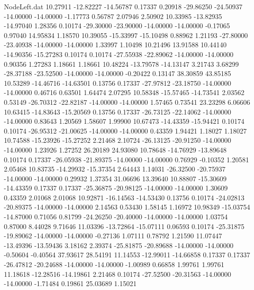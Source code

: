 \begin{filecontents}{NodeLeft.dat}
  10.27911  -12.82227  -14.56787     0.17337    0.20918  -29.86250  -24.50937  -14.00000  -14.00000   -1.17773    0.56787    2.07946    2.50902
  10.33985  -13.82935  -14.97040     1.28356    0.10174  -29.30000  -23.90000  -14.00000  -14.00000   -0.17065    0.97040   14.95834    1.18570
  10.39055  -15.33997  -15.10498     0.88962    1.21193  -27.80000  -23.40938  -14.00000  -14.00000    1.33997    1.10498   10.21496   13.91588
  10.44140  -14.90356  -15.27283     0.10174    0.10174  -27.55938  -22.89062  -14.00000  -14.00000    0.90356    1.27283    1.18661    1.18661
  10.48224  -13.79578  -14.13147     3.21743    3.68299  -28.37188  -23.52500  -14.00000  -14.00000   -0.20422    0.13147   38.30859   43.85185
  10.53289  -14.46716  -14.63501     0.13756    0.17337  -27.97812  -23.18750  -14.00000  -14.00000    0.46716    0.63501    1.64474    2.07295
  10.58348  -15.57465  -14.73541     2.03562    0.53149  -26.70312  -22.82187  -14.00000  -14.00000    1.57465    0.73541   23.23298    6.06606
  10.63415  -14.83643  -15.20569     0.13756    0.17337  -26.73125  -22.14062  -14.00000  -14.00000    0.83643    1.20569    1.58607    1.99900
  10.67473  -14.43359  -15.94421     0.10174    0.10174  -26.95312  -21.00625  -14.00000  -14.00000    0.43359    1.94421    1.18027    1.18027
  10.74588  -15.23926  -15.27252     2.21468    2.10724  -26.13125  -20.91250  -14.00000  -14.00000    1.23926    1.27252   26.20189   24.93080
  10.78648  -14.76929  -13.89648     0.10174    0.17337  -26.05938  -21.89375  -14.00000  -14.00000    0.76929   -0.10352    1.20581    2.05468
  10.83735  -14.29932  -15.37354     2.64443    1.14031  -26.32500  -20.75937  -14.00000  -14.00000    0.29932    1.37354   31.06696   13.39640
  10.88807  -15.30609  -14.43359     0.17337    0.17337  -25.36875  -20.98125  -14.00000  -14.00000    1.30609    0.43359    2.01068    2.01068
  10.92871  -16.14563  -14.53430     0.13756    0.10174  -24.02813  -20.89375  -14.00000  -14.00000    2.14563    0.53430    1.58145    1.16972
  10.98349  -15.03754  -14.87000     0.71056    0.81799  -24.26250  -20.40000  -14.00000  -14.00000    1.03754    0.87000    8.44028    9.71646
  11.03396  -13.72864  -15.07111     0.06593    0.10174  -25.31875  -19.89062  -14.00000  -14.00000   -0.27136    1.07111    0.78792    1.21590
  11.07447  -13.49396  -13.59436     3.18162    2.39374  -25.81875  -20.89688  -14.00000  -14.00000   -0.50604   -0.40564   37.93617   28.54191
  11.14553  -12.99011  -14.66858     0.17337    0.17337  -26.47812  -20.24688  -14.00000  -14.00000   -1.00989    0.66858    1.99761    1.99761
  11.18618  -12.28516  -14.19861     2.21468    0.10174  -27.52500  -20.31563  -14.00000  -14.00000   -1.71484    0.19861   25.03689    1.15021

\end{filecontents}
